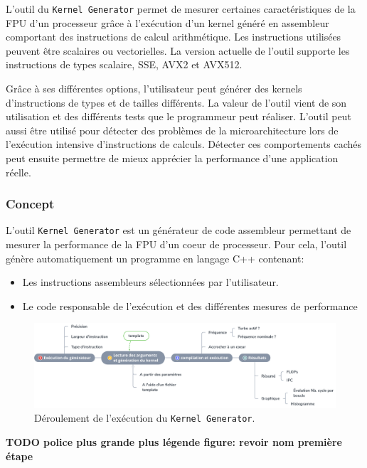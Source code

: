         L'outil du \verb=Kernel Generator= permet de mesurer certaines caractéristiques de la FPU d'un processeur grâce à l'exécution d'un kernel généré en assembleur comportant des instructions de calcul arithmétique. Les instructions utilisées peuvent être scalaires ou vectorielles. La version actuelle de l'outil supporte les instructions de types scalaire, SSE, AVX2 et AVX512. 
            
        Grâce à ses différentes options, l'utilisateur peut générer des kernels d'instructions de types et de tailles différents. La valeur de l'outil vient de son utilisation et des différents tests que le programmeur peut réaliser. L'outil peut aussi être utilisé pour détecter des problèmes de la microarchitecture lors de l'exécution intensive d'instructions de calculs. Détecter ces comportements cachés peut ensuite permettre de mieux apprécier la performance d'une application réelle. 
            

        
        

    \subsubsection{Concept}
        L'outil \verb=Kernel Generator= est un générateur de code assembleur permettant de mesurer la performance de la FPU d'un coeur de processeur. Pour cela, l'outil génère automatiquement un programme en langage C++ contenant:
        \begin{itemize}
            \item Les instructions assembleurs sélectionnées par l'utilisateur. 
            \item Le code responsable de l'exécution et des différentes mesures de performance
        \end{itemize}
                    \begin{figure}
            \center
            \includegraphics[width=17cm]{images/kg_workflow.png}
            \caption{\label{pic_kg_workflow} Déroulement de l'exécution du \texttt{Kernel Generator}.}
            \end{figure}
            \textbf{TODO police plus grande plus légende figure: revoir nom première étape}
            
